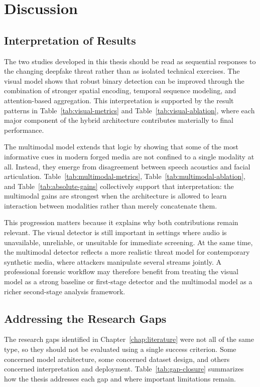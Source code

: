 \chapter{Discussion}
\label{chap:discussion}

\section{Interpretation of Results}

The two studies developed in this thesis should be read as sequential responses to the changing deepfake threat rather than as isolated technical exercises. The visual model shows that robust binary detection can be improved through the combination of stronger spatial encoding, temporal sequence modeling, and attention-based aggregation. This interpretation is supported by the result patterns in Table~\ref{tab:visual-metrics} and Table~\ref{tab:visual-ablation}, where each major component of the hybrid architecture contributes materially to final performance.

The multimodal model extends that logic by showing that some of the most informative cues in modern forged media are not confined to a single modality at all. Instead, they emerge from disagreement between speech acoustics and facial articulation. Table~\ref{tab:multimodal-metrics}, Table~\ref{tab:multimodal-ablation}, and Table~\ref{tab:absolute-gains} collectively support that interpretation: the multimodal gains are strongest when the architecture is allowed to learn interaction between modalities rather than merely concatenate them.

This progression matters because it explains why both contributions remain relevant. The visual detector is still important in settings where audio is unavailable, unreliable, or unsuitable for immediate screening. At the same time, the multimodal detector reflects a more realistic threat model for contemporary synthetic media, where attackers manipulate several streams jointly. A professional forensic workflow may therefore benefit from treating the visual model as a strong baseline or first-stage detector and the multimodal model as a richer second-stage analysis framework.

\section{Addressing the Research Gaps}

The research gaps identified in Chapter~\ref{chap:literature} were not all of the same type, so they should not be evaluated using a single success criterion. Some concerned model architecture, some concerned dataset design, and others concerned interpretation and deployment. Table~\ref{tab:gap-closure} summarizes how the thesis addresses each gap and where important limitations remain.

